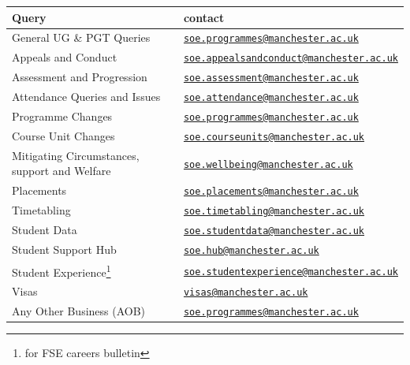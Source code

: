 \documentclass[
  12pt,
]{book}
\newcounter{none} %
\begin{document}
{\def\LTcaptype{none} %
\begin{longtable}[]{@{}
  >{\raggedright\arraybackslash}p{}
  >{\raggedright\arraybackslash}p{}@{}}
\toprule\noalign{}
\begin{minipage}[b]{\linewidth}\raggedright
Query
\end{minipage} & \begin{minipage}[b]{\linewidth}\raggedright
contact
\end{minipage} \\
\midrule\noalign{}
\endhead
\bottomrule\noalign{}
\endlastfoot
General UG \& PGT Queries & \href{mailto:soe.programmes@manchester.ac.uk}{\nolinkurl{soe.programmes@manchester.ac.uk}} \\
Appeals and Conduct & \href{mailto:soe.appealsandconduct@manchester.ac.uk}{\nolinkurl{soe.appealsandconduct@manchester.ac.uk}} \\
Assessment and Progression & \href{mailto:soe.assessment@manchester.ac.uk}{\nolinkurl{soe.assessment@manchester.ac.uk}} \\
Attendance Queries and Issues & \href{mailto:soe.attendance@manchester.ac.uk}{\nolinkurl{soe.attendance@manchester.ac.uk}} \\
Programme Changes & \href{mailto:soe.programmes@manchester.ac.uk}{\nolinkurl{soe.programmes@manchester.ac.uk}} \\
Course Unit Changes & \href{mailto:soe.courseunits@manchester.ac.uk}{\nolinkurl{soe.courseunits@manchester.ac.uk}} \\
Mitigating Circumstances, support and Welfare & \href{mailto:soe.wellbeing@manchester.ac.uk}{\nolinkurl{soe.wellbeing@manchester.ac.uk}} \\
Placements & \href{mailto:soe.placements@manchester.ac.uk}{\nolinkurl{soe.placements@manchester.ac.uk}} \\
Timetabling & \href{mailto:soe.timetabling@manchester.ac.uk}{\nolinkurl{soe.timetabling@manchester.ac.uk}} \\
Student Data & \href{mailto:soe.studentdata@manchester.ac.uk}{\nolinkurl{soe.studentdata@manchester.ac.uk}} \\
Student Support Hub & \href{mailto:soe.hub@manchester.ac.uk}{\nolinkurl{soe.hub@manchester.ac.uk}} \\
Student Experience\footnote{for FSE careers bulletin} & \href{mailto:soe.studentexperience@manchester.ac.uk}{\nolinkurl{soe.studentexperience@manchester.ac.uk}} \\
Visas & \href{mailto:visas@manchester.ac.uk}{\nolinkurl{visas@manchester.ac.uk}} \\
Any Other Business (AOB) & \href{mailto:soe.programmes@manchester.ac.uk}{\nolinkurl{soe.programmes@manchester.ac.uk}} \\
\end{longtable}
}
\end{document}
